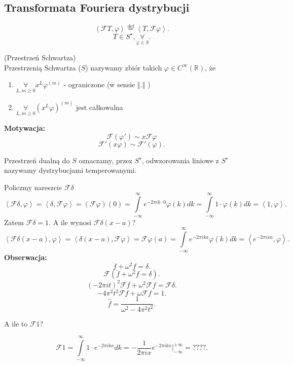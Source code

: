 \documentclass[../main.tex]{subfiles}
\begin{document}
\subsection{Transformata Fouriera dystrybucji}
\[
    \left<\mathcal{F}T, \varphi \right> \overset{\text{def}}{=} \left<T, \mathcal{F}\varphi \right>
.\]
\[
    T\in S^\star, \underset{\varphi\in S}{\forall}
.\]
\begin{definicja}
    (Przestrzeń Schwartza)\\
    Przestrzenią Schwartza ($S$) nazywamy zbiór takich $\varphi\in C^\infty(\mathbb{R})$, że
    \begin{enumerate}
        \item $\underset{L, m \ge 0}{\forall} x^L\varphi^{(m)}$ - ograniczone (w sensie $\left\Vert . \right\Vert $ )
        \item $\underset{L, m \ge 0}{\forall} \left( x^L \varphi \right)^{(m)} $ jest całkowalna
    \end{enumerate}
\end{definicja}
\textbf{Motywacja:}
\[
    \mathcal{F}\left( \varphi' \right)  \sim x \mathcal{F}\varphi
\]
\[
    \mathcal{F}'\left( x\varphi \right) \sim \mathcal{F}'(\varphi)
.\]
\begin{definicja}
    Przestrzeń dualną do $S$ oznaczamy, przez $S^\star$, odwzorowania liniowe z $S^\star$ nazywamy dystrybucjami temperowanymi.
\end{definicja}
Policzmy nareszcie $\mathcal{F}\delta$
\[
    \left<\mathcal{F}\delta, \varphi \right> = \left<\delta, \mathcal{F}\varphi \right> = \left( \mathcal{F}\varphi \right) (0) = \int\limits_{-\infty}^{\infty} e^{-2\pi i k \cdot 0}\varphi(k)dk = \int\limits_{-\infty}^{\infty} 1\cdot \varphi(k)dk = \left<1, \varphi \right>
.\]
Zatem $\mathcal{F}\delta = 1$. A ile wynosi $\mathcal{F}\delta(x-a)$?
\[
    \left<\mathcal{F}\delta(x-a), \varphi\right> = \left<\delta(x-a), \mathcal{F}\varphi \right> = \mathcal{F}\varphi(a) = \int\limits_{-\infty}^{\infty} e^{-2\pi i k a}\varphi(k) dk =\left<e^{-2\pi i x a}, \varphi \right>
.\]
\textbf{Obserwacja:}
\[
    \ddot{f} + \omega^2 f = \delta
.\]
\[
    \mathcal{F}\left( \ddot{f} + \omega^2 f = \delta \right)
.\]
\[
    \left( -2\pi i t \right)^2 \mathcal{F}f + \omega^2 \mathcal{F} f = \mathcal{F} \delta
.\]
\[
    -4\pi^2 t^2 \mathcal{F}f + \omega \mathcal{F}f = 1
.\]
\[
    \hat{f} = \frac{1}{\omega^2 - 4\pi^2t^2}
.\]
\begin{pytanie}
    A ile to $\mathcal{F}1$?
\end{pytanie}
\[
    \mathcal{F}1 = \int\limits_{-\infty}^{\infty} 1\cdot e^{-2\pi i k x}dk = -\frac{1}{2\pi i x}e^{-2\pi i k x}\Big|_{-\infty}^{+\infty} = ????
.\]
\end{document}
